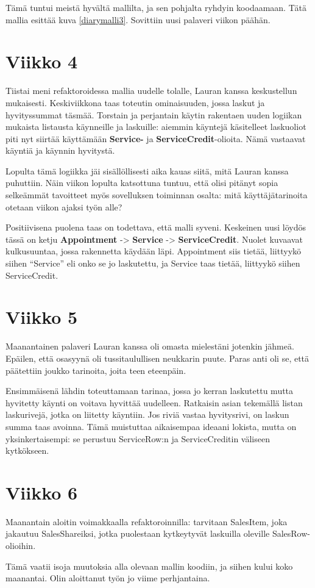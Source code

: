 Tämä tuntui meistä hyvältä mallilta, ja sen pohjalta ryhdyin koodaamaan.
Tätä mallia esittää kuva \ref{diarymalli3}. Sovittiin uusi palaveri
viikon päähän.

\hypertarget{viikko-4}{%
\section{Viikko 4}\label{viikko-4}}

Tiistai meni refaktoroidessa mallia uudelle tolalle, Lauran kanssa
keskustellun mukaisesti. Keskiviikkona taas toteutin ominaisuuden, jossa
laskut ja hyvityssummat täsmää. Torstain ja perjantain käytin rakentaen
uuden logiikan mukaista listausta käynneille ja laskuille: aiemmin
käyntejä käsitelleet laskuoliot piti nyt siirtää käyttämään
\textbf{Service-} ja \textbf{ServiceCredit}-olioita. Nämä vastaavat
käyntiä ja käynnin hyvitystä.

Lopulta tämä logiikka jäi sisällöllisesti aika kauas siitä, mitä Lauran
kanssa puhuttiin. Näin viikon lopulta katsottuna tuntuu, että olisi
pitänyt sopia selkeämmät tavoitteet myös sovelluksen toiminnan osalta:
mitä käyttäjätarinoita otetaan viikon ajaksi työn alle?

Positiivisena puolena taas on todettava, että malli syveni. Keskeinen
uusi löydös tässä on ketju \textbf{Appointment} -\textgreater{}
\textbf{Service} -\textgreater{} \textbf{ServiceCredit}. Nuolet kuvaavat
kulkusuuntaa, jossa rakennetta käydään läpi. Appointment siis tietää,
liittyykö siihen ``Service'' eli onko se jo laskutettu, ja Service taas
tietää, liittyykö siihen ServiceCredit.

\hypertarget{viikko-5}{%
\section{Viikko 5}\label{viikko-5}}

Maanantainen palaveri Lauran kanssa oli omasta mielestäni jotenkin
jähmeä. Epäilen, että osasyynä oli tussitaulullisen neukkarin puute.
Paras anti oli se, että päätettiin joukko tarinoita, joita teen
eteenpäin.

Ensimmäisenä lähdin toteuttamaan tarinaa, jossa jo kerran laskutettu
mutta hyvitetty käynti on voitava hyvittää uudelleen. Ratkaisin asian
tekemällä listan laskurivejä, jotka on liitetty käyntiin. Jos riviä
vastaa hyvitysrivi, on laskun summa taas avoinna. Tämä muistuttaa
aikaisempaa ideaani lokista, mutta on yksinkertaisempi: se perustuu
ServiceRow:n ja ServiceCreditin väliseen kytkökseen.

\hypertarget{viikko-6}{%
\section{Viikko 6}\label{viikko-6}}

Maanantain aloitin voimakkaalla refaktoroinnilla: tarvitaan SalesItem,
joka jakautuu SalesShareiksi, jotka puolestaan kytkeytyvät laskuilla
oleville SalesRow-olioihin.

Tämä vaatii isoja muutoksia alla olevaan mallin koodiin, ja siihen kului
koko maanantai. Olin aloittanut työn jo viime perhjantaina.
